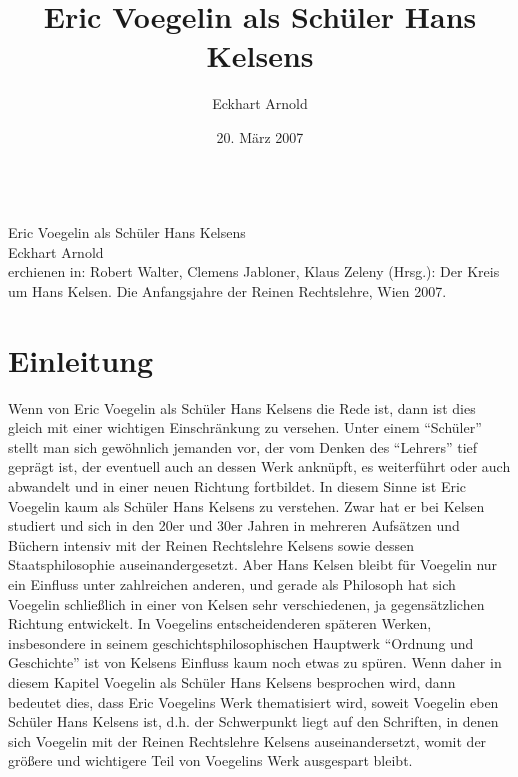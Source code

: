 \documentclass[12pt,a4paper,ngerman]{article}
\begin{document}
\selectlanguage{\ngerman}

\title{Eric Voegelin als Schüler Hans Kelsens}
\author{Eckhart Arnold}
\date{20. März 2007}


\begin{titlepage}
\begin{center}
\ \\[4cm]{\Huge Eric Voegelin als Schüler Hans Kelsens}\\[2cm]
{\Large Eckhart Arnold}\\[3cm]
{\small erchienen in: Robert Walter, Clemens Jabloner, Klaus Zeleny (Hrsg.): Der Kreis um Hans Kelsen. Die Anfangsjahre der Reinen Rechtslehre, Wien 2007.}
\end{center}

\end{titlepage}





\newpage

\tableofcontents

\setcounter{page}{1}


\section{Einleitung}

Wenn von Eric Voegelin als Schüler Hans Kelsens die Rede ist, dann ist
dies gleich mit einer wichtigen Einschränkung zu versehen. Unter einem
"`Schüler"' stellt man sich gewöhnlich jemanden vor, der vom Denken
des "`Lehrers"' tief geprägt ist, der eventuell auch an dessen Werk
anknüpft, es weiterführt oder auch abwandelt und in einer neuen
Richtung fortbildet. In diesem Sinne ist Eric Voegelin kaum als
Schüler Hans Kelsens zu verstehen. Zwar hat er bei Kelsen
studiert und sich in den 20er und 30er Jahren in mehreren Aufsätzen
und Büchern intensiv mit der Reinen Rechtslehre Kelsens sowie
dessen Staatsphilosophie auseinandergesetzt. Aber Hans Kelsen bleibt
für Voegelin nur ein Einfluss unter zahlreichen anderen, und gerade
als Philosoph hat sich Voegelin schließlich in einer von Kelsen sehr
verschiedenen, ja gegensätzlichen Richtung entwickelt. In Voegelins
entscheidenderen späteren Werken, insbesondere in seinem
geschichtsphilosophischen Hauptwerk "`Ordnung und Geschichte"' ist von
Kelsens Einfluss kaum noch etwas zu spüren. Wenn daher in diesem
Kapitel Voegelin als Schüler Hans Kelsens besprochen wird, dann
bedeutet dies, dass Eric Voegelins Werk thematisiert wird, soweit
Voegelin eben Schüler Hans Kelsens ist, d.h. der Schwerpunkt liegt auf
den Schriften, in denen sich Voegelin mit der Reinen Rechtslehre
Kelsens auseinandersetzt, womit der größere und wichtigere Teil von
Voegelins Werk ausgespart bleibt.
\end{document}

